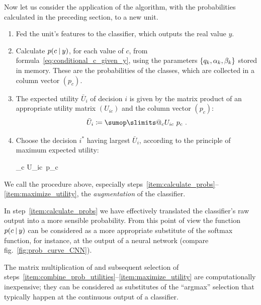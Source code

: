 \documentclass[\ifafour a4paper,12pt,\else a5paper,10pt,\fi%
onecolumn,oneside,article,%
british%
]{memoir}
\makeatletter
\newcommand*{\widefbox}[1]{\fbox{\hspace{1em}#1\hspace{1em}}}
\theoremstyle{remark}
\theoremstyle{innote}
\def\sum{\DOTSI\sumop\slimits@}
\newcommand*{\defd}{\coloneqq}
\DeclarePairedDelimiter\set{\{}{\}} %
\renewcommand*{\|}[1][]{\nonscript\:#1\vert\nonscript\:\mathopen{}}
\newcommand*{\fig}{fig.}%
\DeclareMathOperator*{\argmax}{arg\,max}
\newcommand*{\eu}{\bar{U}}
\makeatother
\begin{document}
\medskip

Now let us consider the application of the algorithm, with the probabilities calculated in the preceding section, to a new unit.

\begin{enumerate}[label=\arabic*.]
\item Fed the unit's features to the classifier, which outputs the real value $y$.

\item\label{item:calculate_probs} Calculate $p(c \| y)$, for each value of $c$, from formula~\eqref{eq:conditional_c_given_y}, using the parameters $\set{q_{k}, \alpha_{k}, \beta_{k}}$ stored in memory. These are the probabilities of the classes, which are collected in a column vector $(p_{c})$.

\item\label{item:combine_prob_utilities} The expected utility $\eu_{i}$ of decision $i$ is given by the matrix product of an appropriate utility matrix $(U_{ic})$ and the column vector $(p_{c})$:
  \begin{equation}
    \label{eq:expe_utilities}
    \eu_{i} \defd \sum_{c} U_{ic}\ p_{c} \ .
  \end{equation}

\item\label{item:maximize_utility} Choose the decision $i^{*}$ having largest $\eu_{i}$, according to the principle of maximum expected utility:
  \begin{empheq}[box=\widefbox]{equation}
    \label{eq:max_expe_utility}
    \text{choose}\quad
    i^{*} = \argmax_{i}\set*{\eu_{i}} \equiv \argmax_{i}\set[\bigg]{\sum_{c} U_{ic}\ p_{c}}
  \end{empheq}
\end{enumerate}

\medskip

We call the procedure above, especially steps~\ref{item:calculate_probs}--\ref{item:maximize_utility}, the \emph{augmentation} of the classifier.

In step~\ref{item:calculate_probs} we have effectively translated the classifier's raw output into a more sensible probability. From this point of view the function $p(c \| y)$ can be considered as a more appropriate substitute of the softmax function, for instance, at the output of a neural network (compare \fig~\ref{fig:prob_curve_CNN}).

The matrix multiplication of and subsequent selection of steps~\ref{item:combine_prob_utilities}--\ref{item:maximize_utility} are computationally inexpensive; they can be considered as substitutes of the \enquote{argmax} selection that typically happen at the continuous output of a classifier.
\end{document}
